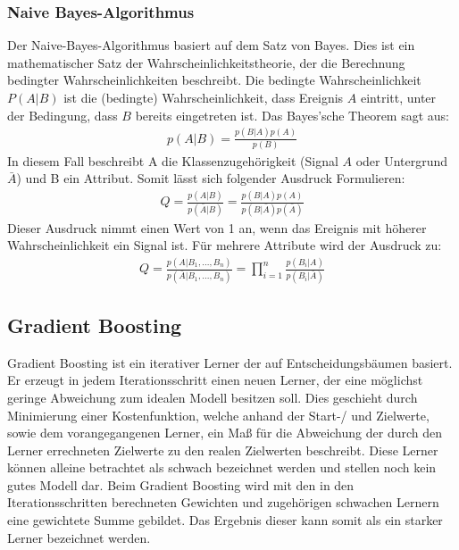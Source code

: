 \subsubsection{Naive Bayes-Algorithmus}
\label{sec:dernaivebayes}

Der Naive-Bayes-Algorithmus basiert auf dem Satz von Bayes.
Dies ist ein mathematischer Satz der Wahrscheinlichkeitstheorie, der die Berechnung bedingter Wahrscheinlichkeiten beschreibt.
Die bedingte Wahrscheinlichkeit $P(A \vert B)$ ist die (bedingte) Wahrscheinlichkeit, dass Ereignis $A$ eintritt, unter der Bedingung, dass $B$ bereits eingetreten ist.
Das Bayes'sche Theorem sagt aus:
\begin{align*}
	p(A \vert B) = \frac{p(B\vert A)p(A)}{p(B)}
\end{align*}
In diesem Fall beschreibt A die Klassenzugehörigkeit (Signal $A$ oder Untergrund $\bar{A}$) und B ein Attribut. 
Somit lässt sich folgender Ausdruck Formulieren:
\begin{align*}
	Q = \frac{p(A \vert B)}{p(\bar{A}\vert B)}=\frac{p(B \vert A)p(A)}{p(B \vert \bar{A})p(\bar{A})}
\end{align*}
Dieser Ausdruck nimmt einen Wert von 1 an, wenn das Ereignis mit höherer Wahrscheinlichkeit ein Signal ist.
Für mehrere Attribute wird der Ausdruck zu:
\begin{align*}
	Q = \frac{p(A \vert B_1,...,B_n)}{p(\bar{A}\vert B_1,...,B_n)}=\prod_{i=1}^n \frac{p(B_i \vert A)}{p(B_i \vert \bar{A})}
\end{align*}

\subsection{Gradient Boosting}
\label{sec:gradient}

Gradient Boosting ist ein iterativer Lerner der auf Entscheidungsbäumen basiert.
Er erzeugt in jedem Iterationsschritt einen neuen Lerner, der eine möglichst geringe Abweichung zum idealen Modell besitzen soll.
Dies geschieht durch Minimierung einer Kostenfunktion, welche anhand der Start-/ und Zielwerte, sowie dem vorangegangenen Lerner, ein Maß für die Abweichung der durch den Lerner errechneten Zielwerte zu den realen Zielwerten beschreibt.
Diese Lerner können alleine betrachtet als schwach bezeichnet werden und stellen noch kein gutes Modell dar.
Beim Gradient Boosting wird mit den in den Iterationsschritten berechneten Gewichten und zugehörigen schwachen Lernern eine gewichtete Summe gebildet.
Das Ergebnis dieser kann somit als ein starker Lerner bezeichnet werden.



